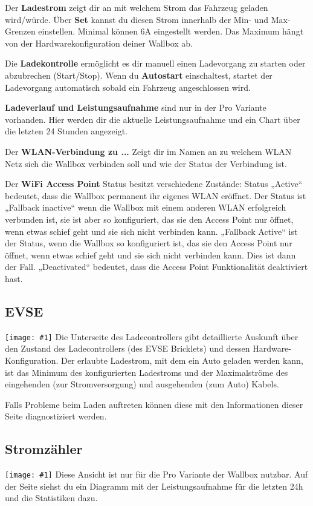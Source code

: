 \documentclass[a4paper,10pt]{article}
\newcommand{\gfx}[1]{\texttt{[image: \#1]}}
\begin{document}
\begin{multicols*}{2}
	Der \textbf{Ladestrom} zeigt dir an mit welchem Strom das Fahrzeug geladen
	wird/würde. Über \textbf{Set} kannst du diesen Strom innerhalb der Min-
	und Max-Grenzen einstellen. Minimal können 6A eingestellt werden. Das
	Maximum hängt von der Hardwarekonfiguration deiner Wallbox ab.
	
	Die \textbf{Ladekontrolle} ermöglicht es dir manuell einen Ladevorgang zu
	starten oder abzubrechen (Start/Stop). Wenn du \textbf{Autostart}
	einschaltest, startet der Ladevorgang automatisch sobald ein Fahrzeug
	angeschlossen wird.

	\textbf{Ladeverlauf und Leistungsaufnahme} sind nur in der Pro Variante
	vorhanden. Hier werden dir die aktuelle Leistungsaufnahme und ein Chart über
	die letzten 24 Stunden angezeigt.

	Der \textbf{WLAN-Verbindung zu ...} Zeigt dir im Namen an zu welchem WLAN 
	Netz sich die Wallbox verbinden soll und wie der Status der Verbindung ist.

	Der \textbf{WiFi Access Point} Status besitzt verschiedene Zustände: Status
	„Active“ bedeutet, dass die Wallbox permanent ihr eigenes WLAN eröffnet. Der
	Status ist „Fallback inactive“ wenn die Wallbox mit einem anderen WLAN
	erfolgreich verbunden ist, sie ist aber so konfiguriert, das sie den Access
	Point nur öffnet, wenn etwas schief geht und sie sich nicht verbinden kann.
	„Fallback Active“ ist der Status, wenn die Wallbox so konfiguriert ist, das sie
	den Access Point nur öffnet, wenn etwas schief geht und sie sich nicht
	verbinden kann. Dies ist dann der Fall. „Deactivated“ bedeutet, dass die Access
	Point Funktionalität deaktiviert hast.

	\subsection{EVSE}
	\gfx{./img/resized/web_evse}
	Die Unterseite des Ladecontrollers gibt detaillierte Auskunft über den Zustand
	des Ladecontrollers (des EVSE Bricklets) und dessen Hardware-Konfiguration. Der
	erlaubte Ladestrom, mit dem ein Auto geladen werden kann, ist das Minimum des 
	konfigurierten Ladestroms und der Maximalströme des eingehenden 
	(zur Stromversorgung) und ausgehenden (zum Auto) Kabels.

	Falls Probleme beim Laden auftreten können diese mit den Informationen dieser 
	Seite diagnostiziert werden.

	\subsection{Stromzähler}
	\gfx{./img/resized/web_counter}
	Diese Ansicht ist nur für die Pro Variante der Wallbox nutzbar. Auf der Seite
	siehst du ein Diagramm mit der Leistungsaufnahme für die letzten 24h und die
	Statistiken dazu.


\end{multicols*}
\end{document}
